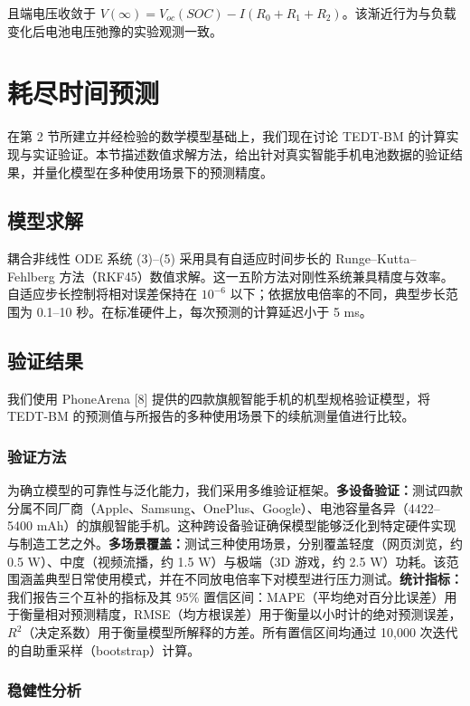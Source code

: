 \documentclass[11pt,a4paper]{ctexart}
\begin{document}
且端电压收敛于 $V(\infty) = V_{oc}(SOC) - I(R_0 + R_1 + R_2)$。该渐近行为与负载变化后电池电压弛豫的实验观测一致。

\section{耗尽时间预测}

在第 2 节所建立并经检验的数学模型基础上，我们现在讨论 TEDT-BM 的计算实现与实证验证。本节描述数值求解方法，给出针对真实智能手机电池数据的验证结果，并量化模型在多种使用场景下的预测精度。

\subsection{模型求解}

耦合非线性 ODE 系统 (3)--(5) 采用具有自适应时间步长的 Runge--Kutta--Fehlberg 方法（RKF45）数值求解。这一五阶方法对刚性系统兼具精度与效率。自适应步长控制将相对误差保持在 $10^{-6}$ 以下；依据放电倍率的不同，典型步长范围为 0.1--10 秒。在标准硬件上，每次预测的计算延迟小于 5 ms。

\subsection{验证结果}

我们使用 PhoneArena [8] 提供的四款旗舰智能手机的机型规格验证模型，将 TEDT-BM 的预测值与所报告的多种使用场景下的续航测量值进行比较。

\subsubsection{验证方法}

为确立模型的可靠性与泛化能力，我们采用多维验证框架。\textbf{多设备验证：}测试四款分属不同厂商（Apple、Samsung、OnePlus、Google）、电池容量各异（4422--5400 mAh）的旗舰智能手机。这种跨设备验证确保模型能够泛化到特定硬件实现与制造工艺之外。\textbf{多场景覆盖：}测试三种使用场景，分别覆盖轻度（网页浏览，约 0.5 W）、中度（视频流播，约 1.5 W）与极端（3D 游戏，约 2.5 W）功耗。该范围涵盖典型日常使用模式，并在不同放电倍率下对模型进行压力测试。\textbf{统计指标：}我们报告三个互补的指标及其 95\% 置信区间：MAPE（平均绝对百分比误差）用于衡量相对预测精度，RMSE（均方根误差）用于衡量以小时计的绝对预测误差，$R^2$（决定系数）用于衡量模型所解释的方差。所有置信区间均通过 10,000 次迭代的自助重采样（bootstrap）计算。

\subsubsection{稳健性分析}
\end{document}
